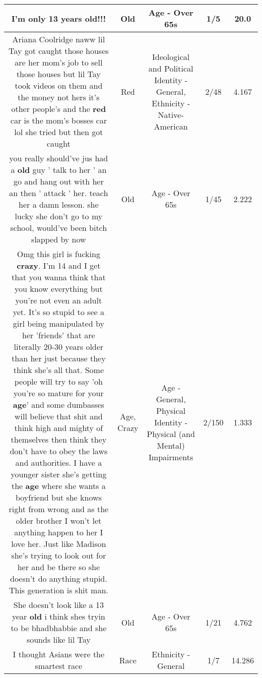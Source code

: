 \documentclass[11pt]{article}
\newlength\mylength
\begin{document}
\begin{center}
\begin{longtable}{|C{.65\mylength}|C{.30\mylength}|C{.12\mylength}|C{.12\mylength}|C{.12\mylength}|}
  \small I'm only 13 years \textbf{old}!!!\normalsize   & Old & Age - Over 65s & 1/5 & 20.0 \\  \hline
  \small Ariana Coolridge naww lil Tay got caught those houses are her mom's job to sell those houses but lil Tay took videos on them and the money not hers it's other people's and the \textbf{r\textbf{ed}} car is the mom's bosses car lol she tried but then got caught\normalsize   & Red &  Ideological and Political Identity - General, Ethnicity - Native-American & 2/48 & 4.167 \\  \hline
  \small you really should've jus had a \textbf{old} guy ' talk to her ' an go and hang out with her an then ' attack ' her. teach her a damn lesson. she lucky she don't go to my school, would've been bitch slapped by now\normalsize   & Old & Age - Over 65s & 1/45 & 2.222 \\  \hline
  \small Omg this girl is fucking \textbf{crazy}. I'm 14 and I get that you wanna think that you know everything but you're not even an adult yet. It's so stupid to see a girl being manipulated by her 'friends' that are literally 20-30 years older than her just because they think she's all that. Some people will try to say 'oh you're so mature for your \textbf{age}' and some dumbasses will believe that shit and think high and mighty of themselves then think they don't have to obey the laws and authorities. I have a younger sister she's getting the \textbf{age} where she wants a boyfriend but she knows right from wrong and as the older brother I won't let anything happen to her I love her. Just like Madison she's trying to look out for her and be there so she doesn't do anything stupid. This generation is shit man.\normalsize   & Age, Crazy & Age - General, Physical Identity - Physical (and Mental) Impairments & 2/150 & 1.333 \\  \hline
  \small She doesn't look like a 13 year \textbf{old} i think shes tryin to be bhadbhabbie and she sounds like lil Tay\normalsize   & Old & Age - Over 65s & 1/21 & 4.762 \\  \hline
  \small I thought Asians were the smartest race\normalsize   & Race & Ethnicity - General & 1/7 & 14.286 \\  \hline

\end{longtable}
\end{center}
\end{document}
